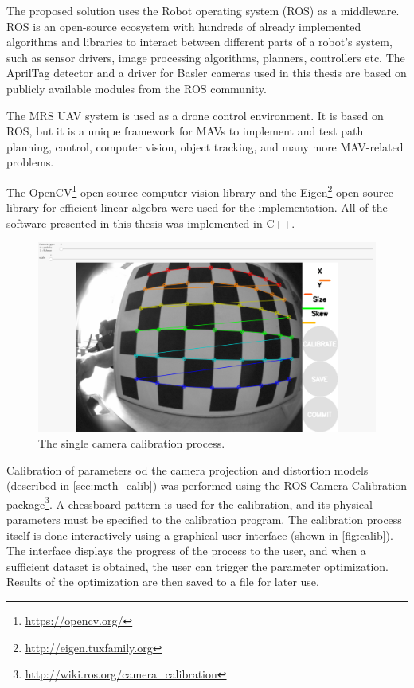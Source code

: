 The proposed solution uses the Robot operating system (ROS) \cite{Rospaper} as a middleware.
ROS is an open-source ecosystem with hundreds of already implemented algorithms and libraries to interact between different parts of a robot's system, such as sensor drivers, image processing algorithms, planners, controllers etc.
The AprilTag detector and a driver for Basler cameras used in this thesis are based on publicly available modules from the ROS community.

The MRS UAV system \cite{Baca2021} is used as a drone control environment. It is based on ROS, but it is a unique framework for MAVs to implement and test path planning, control, computer vision, object tracking, and many more MAV-related problems.

The OpenCV\footnote{\url{https://opencv.org/}} open-source computer vision library and the Eigen\footnote{\url{http://eigen.tuxfamily.org}} open-source library for efficient linear algebra were used for the implementation.
All of the software presented in this thesis was implemented in C++.

\begin{figure}[ht]
    \centering
    \includegraphics[width=.6\textwidth]{graphics/calibration.png}
    \caption{The single camera calibration process.}
    \label{fig:calib}
\end{figure}

Calibration of parameters od the camera projection and distortion models (described in \autoref{sec:meth_calib}) was performed using the ROS Camera Calibration package\footnote{\url{http://wiki.ros.org/camera_calibration}}.
A chessboard pattern is used for the calibration, and its physical parameters must be specified to the calibration program.
The calibration process itself is done interactively using a graphical user interface (shown in \autoref{fig:calib}).
The interface displays the progress of the process to the user, and when a sufficient dataset is obtained, the user can trigger the parameter optimization. 
Results of the optimization are then saved to a file for later use.

